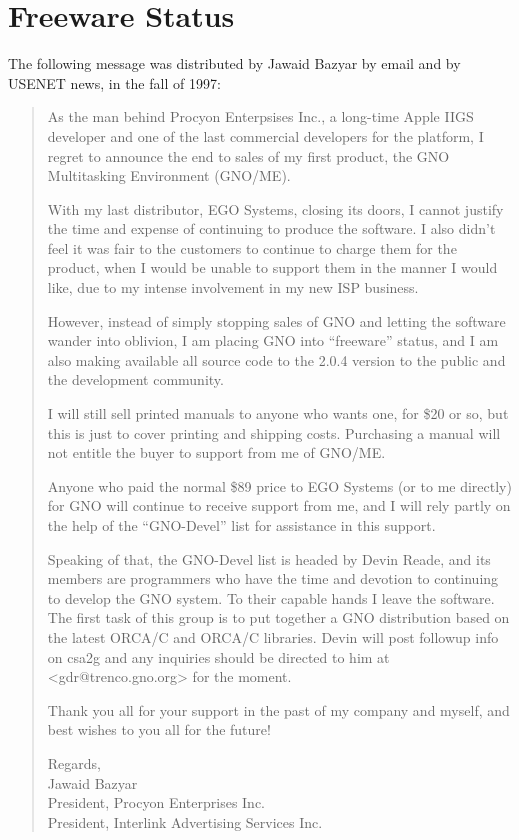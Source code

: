 \documentclass{report}
\begin{document}
\section{Freeware Status}

The following message was distributed by Jawaid Bazyar by email and
by USENET news, in the fall of 1997:

\begin{quote}

As the man behind Procyon Enterpsises Inc., a long-time Apple IIGS
developer and one of the last commercial developers for the platform,
I regret to announce the end to sales of my first product, the GNO
Multitasking Environment (GNO/ME).

With my last distributor, EGO Systems, closing its doors, I cannot
justify the time and expense of continuing to produce the software. I
also didn't feel it was fair to the customers to continue to charge them
for the product, when I would be unable to support them in the manner
I would like, due to my intense involvement in my new ISP business.

However, instead of simply stopping sales of GNO and letting the software
wander into oblivion, I am placing GNO into ``freeware'' status, and I am
also making available all source code to the 2.0.4 version to the public
and the development community.

I will still sell printed manuals to anyone who wants one, for \$20 or
so, but this is just to cover printing and shipping costs. Purchasing
a manual will not entitle the buyer to support from me of GNO/ME.

Anyone who paid the normal \$89 price to EGO Systems (or to me directly)
for GNO will continue to receive support from me, and I will rely partly
on the help of the ``GNO-Devel'' list for assistance in this support.

Speaking of that, the GNO-Devel list is headed by Devin Reade,
and its members are programmers who have the time and devotion to
continuing to develop the GNO system. To their capable hands I leave
the software. The first task of this group is to put together a GNO
distribution based on the latest ORCA/C and ORCA/C libraries. Devin will
post followup info on csa2g and any inquiries should be directed to him
at <gdr@trenco.gno.org> for the moment.

Thank you all for your support in the past of my company and myself,
and best wishes to you all for the future!

\begin{flushleft}
Regards, \\

Jawaid Bazyar \\
President, Procyon Enterprises Inc. \\
President, Interlink Advertising Services Inc. \\
\end{flushleft}

\end{quote}
\end{document}
